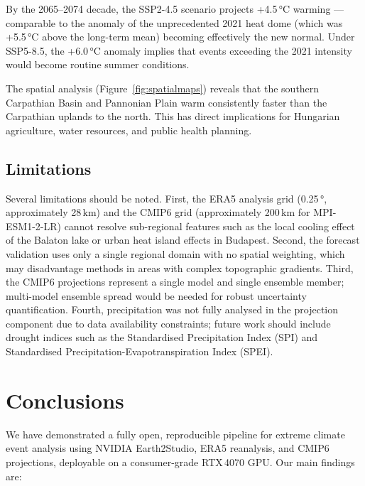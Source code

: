 \documentclass[12pt,a4paper]{article}
\begin{document}
By the 2065--2074 decade, the SSP2-4.5 scenario projects +4.5\,°C
warming — comparable to the anomaly of the unprecedented 2021 heat dome
(which was +5.5\,°C above the long-term mean) becoming effectively the
new normal. Under SSP5-8.5, the +6.0\,°C anomaly implies that events
exceeding the 2021 intensity would become routine summer conditions.

The spatial analysis (Figure~\ref{fig:spatialmaps}) reveals that the
southern Carpathian Basin and Pannonian Plain warm consistently faster
than the Carpathian uplands to the north. This has direct implications
for Hungarian agriculture, water resources, and public health planning.

\subsection{Limitations}

Several limitations should be noted. First, the ERA5 analysis grid
(0.25\,°, approximately 28\,km) and the CMIP6 grid (approximately
200\,km for MPI-ESM1-2-LR) cannot resolve sub-regional features such
as the local cooling effect of the Balaton lake or urban heat island
effects in Budapest. Second, the forecast validation uses only a single
regional domain with no spatial weighting, which may disadvantage
methods in areas with complex topographic gradients. Third, the CMIP6
projections represent a single model and single ensemble member;
multi-model ensemble spread would be needed for robust uncertainty
quantification. Fourth, precipitation was not fully analysed in the
projection component due to data availability constraints; future work
should include drought indices such as the Standardised Precipitation
Index (SPI) and Standardised Precipitation-Evapotranspiration Index
(SPEI).

\section{Conclusions}
\label{sec:conclusions}

We have demonstrated a fully open, reproducible pipeline for extreme
climate event analysis using NVIDIA Earth2Studio, ERA5 reanalysis, and
CMIP6 projections, deployable on a consumer-grade RTX\,4070 GPU. Our
main findings are:
\end{document}
